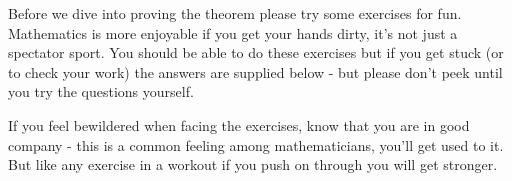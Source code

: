 \documentclass{article}
\begin{document}
%
%

Before we dive into proving the theorem please try some exercises for fun.
Mathematics is more enjoyable if you get your hands dirty, it's not
just a spectator sport.
You should be able to do these exercises but if you get stuck (or to
check your work) the
answers are supplied below - but please don't peek until you try the questions yourself.

If you feel bewildered when facing the exercises, know that you are in good
company - this is a common feeling among mathematicians, you'll get used to it.
But like any exercise in a workout if you push on through you will get stronger.
\end{document}
